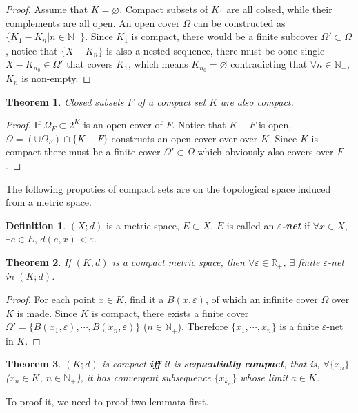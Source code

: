 \documentclass[openany]{book}
\newcommand*{\indexbf}[1]{\emph{\textbf{#1}}\index{#1}} %
\theoremstyle{plain}
\newtheorem{theorem}{Theorem}[section] %
\theoremstyle{definition}
\newtheorem{definition}{Definition}[section] %
\newcommand{\emphbf}[1]{\emph{\textbf{#1}}}
\begin{document}
\begin{proof}
	Assume that $K=\varnothing$. Compact subsets of $K_1$ are all colsed, while their complements are all open. An open cover $\Omega$ can be constructed as $\{K_1-K_n|n\in\mathbb{N}_+\}$. Since $K_1$ is compact, there would be a finite subcover $\Omega'\subset\Omega$, notice that $\{X-K_n\}$ is also a nested sequence, there must be oone single $X-K_{n_0}\in\Omega'$ that covers $K_1$, which means $K_{n_0}=\varnothing$ contradicting that $\forall n\in\mathbb{N}_+$, $K_n$ is non-empty.
\end{proof}
\begin{theorem}\label{compact_closed_subset}
Closed subsets $F$ of a compact set $K$ are also compact.
\end{theorem}
\begin{proof}
	If $\Omega_F\subset 2^K$ is an open cover of $F$. Notice that $K - F$ is open, $\Omega=\left(\cup\Omega_F\right)\cap\{K-F\}$ constructs an open cover over over $K$. Since $K$ is compact there must be a finite cover $\Omega'\subset\Omega$ which obviously also covers over $F$.
\end{proof}
The following propoties of compact sets are on the topological space induced from a metric space.
\begin{definition}\label{e-net}
	$(X;d)$ is a metric space, $E\subset X$. $E$ is called an \indexbf{$\varepsilon$-net} if $\forall x\in X$,$\exists e\in E$, $d(e,x)<\varepsilon$.
\end{definition}
\begin{theorem}\label{finite_e-net}
If $(K,d)$ is a compact metric space, then $\forall \varepsilon\in\mathbb{R}_+$, $\exists$ finite $\varepsilon$-net in $(K;d)$. 
\end{theorem}
\begin{proof}
	For each point $x\in K$, find it a $B(x,\varepsilon)$, of which an infinite cover $\Omega$ over $K$ is made. Since $K$ is compact, there exists a finite cover $\Omega'=\{B(x_1,\varepsilon),\cdots,B(x_n,\varepsilon)\}$ ($n\in\mathbb{N}_+$). Therefore $\{x_1,\cdots,x_n\}$ is a finite $\varepsilon$-net in $K$.
\end{proof}
\begin{theorem}\label{sequentially_compact_metric}
$(K;d)$ is compact \emphbf{iff} it is \indexbf{sequentially compact}, that is, $\forall \{x_n\}$ ($x_n\in K$, $n\in\mathbb{N}_+$), it has convergent subsequence $\{x_{k_n}\}$ whose limit $a\in K$.
\end{theorem}
To proof it, we need to proof two lemmata first.
\end{document}
